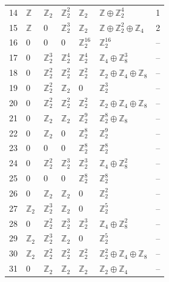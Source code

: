 \documentclass[10pt]{article}
\begin{document}
\begin{longtable}{rlllllr}
14 & $\mathbb{Z}$ & $\mathbb{Z}_{2}$ & $\mathbb{Z}_{2}^{2}$ & $\mathbb{Z}_{2}$ & $\mathbb{Z}\oplus \mathbb{Z}_{2}^{4}$ & 1 \\
15 & $\mathbb{Z}$ & $0$ & $\mathbb{Z}_{2}^{3}$ & $\mathbb{Z}_{2}$ & $\mathbb{Z}\oplus \mathbb{Z}_{2}^{2}\oplus \mathbb{Z}_{4}$ & 2 \\
16 & $0$ & $0$ & $0$ & $\mathbb{Z}_{2}^{16}$ & $\mathbb{Z}_{2}^{16}$ & -- \\
17 & $0$ & $\mathbb{Z}_{2}^{3}$ & $\mathbb{Z}_{2}^{4}$ & $\mathbb{Z}_{2}^{4}$ & $\mathbb{Z}_{4}\oplus \mathbb{Z}_{8}^{3}$ & -- \\
18 & $0$ & $\mathbb{Z}_{2}^{2}$ & $\mathbb{Z}_{2}^{2}$ & $\mathbb{Z}_{2}^{2}$ & $\mathbb{Z}_{2}\oplus \mathbb{Z}_{4}\oplus \mathbb{Z}_{8}$ & -- \\
19 & $0$ & $\mathbb{Z}_{2}^{2}$ & $\mathbb{Z}_{2}$ & $0$ & $\mathbb{Z}_{2}^{3}$ & -- \\
20 & $0$ & $\mathbb{Z}_{2}^{2}$ & $\mathbb{Z}_{2}^{2}$ & $\mathbb{Z}_{2}^{2}$ & $\mathbb{Z}_{2}\oplus \mathbb{Z}_{4}\oplus \mathbb{Z}_{8}$ & -- \\
21 & $0$ & $\mathbb{Z}_{2}$ & $\mathbb{Z}_{2}$ & $\mathbb{Z}_{2}^{9}$ & $\mathbb{Z}_{2}^{8}\oplus \mathbb{Z}_{8}$ & -- \\
22 & $0$ & $\mathbb{Z}_{2}$ & $0$ & $\mathbb{Z}_{2}^{8}$ & $\mathbb{Z}_{2}^{9}$ & -- \\
23 & $0$ & $0$ & $0$ & $\mathbb{Z}_{2}^{8}$ & $\mathbb{Z}_{2}^{8}$ & -- \\
24 & $0$ & $\mathbb{Z}_{2}^{2}$ & $\mathbb{Z}_{2}^{3}$ & $\mathbb{Z}_{2}^{3}$ & $\mathbb{Z}_{4}\oplus \mathbb{Z}_{8}^{2}$ & -- \\
25 & $0$ & $0$ & $0$ & $\mathbb{Z}_{2}^{8}$ & $\mathbb{Z}_{2}^{8}$ & -- \\
26 & $0$ & $\mathbb{Z}_{2}$ & $\mathbb{Z}_{2}$ & $0$ & $\mathbb{Z}_{2}^{2}$ & -- \\
27 & $\mathbb{Z}_{2}$ & $\mathbb{Z}_{2}^{3}$ & $\mathbb{Z}_{2}$ & $0$ & $\mathbb{Z}_{2}^{5}$ & -- \\
28 & $0$ & $\mathbb{Z}_{2}^{2}$ & $\mathbb{Z}_{2}^{3}$ & $\mathbb{Z}_{2}^{3}$ & $\mathbb{Z}_{4}\oplus \mathbb{Z}_{8}^{2}$ & -- \\
29 & $\mathbb{Z}_{2}$ & $\mathbb{Z}_{2}^{3}$ & $\mathbb{Z}_{2}$ & $0$ & $\mathbb{Z}_{2}^{5}$ & -- \\
30 & $\mathbb{Z}_{2}$ & $\mathbb{Z}_{2}^{2}$ & $\mathbb{Z}_{2}^{2}$ & $\mathbb{Z}_{2}^{2}$ & $\mathbb{Z}_{2}^{2}\oplus \mathbb{Z}_{4}\oplus \mathbb{Z}_{8}$ & -- \\
31 & $0$ & $\mathbb{Z}_{2}$ & $\mathbb{Z}_{2}$ & $\mathbb{Z}_{2}$ & $\mathbb{Z}_{2}\oplus \mathbb{Z}_{4}$ & -- \\

\end{longtable}
\end{document}
